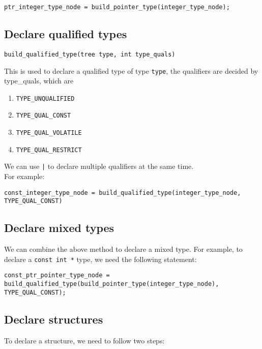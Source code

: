 \documentclass[11pt]{article}
\begin{document}
\begin{lstlisting}[mathescape]
ptr_integer_type_node = build_pointer_type(integer_type_node);
\end{lstlisting}


\subsection{Declare qualified types}
\begin{lstlisting}[mathescape]
build_qualified_type(tree type, int type_quals)
\end{lstlisting}
This is used to declare a qualified type of type \texttt{type}, the qualifiers are decided by type\_quals, which are 
\begin{enumerate}
	\item \texttt{TYPE\_UNQUALIFIED}
	\item \texttt{TYPE\_QUAL\_CONST}
	\item \texttt{TYPE\_QUAL\_VOLATILE}
	\item \texttt{TYPE\_QUAL\_RESTRICT}
\end{enumerate}

We can use \texttt{|} to declare multiple qualifiers at the same time.\\

For example:
\begin{lstlisting}[mathescape]
const_integer_type_node = build_qualified_type(integer_type_node, TYPE_QUAL_CONST)
\end{lstlisting}


\subsection{Declare mixed types}
We can combine the above method to declare a mixed type. For example, to declare a \texttt{const int *} type, we need the following statement:
\begin{lstlisting}[mathescape]
const_ptr_pointer_type_node = build_qualified_type(build_pointer_type(integer_type_node), TYPE_QUAL_CONST);
\end{lstlisting}


\subsection{Declare structures}
To declare a structure, we need to follow two steps:
\end{document}
